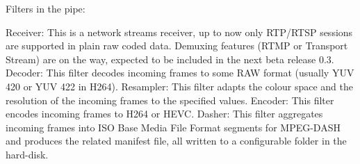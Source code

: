 Filters in the pipe:

Receiver: This is a network streams receiver, up to now only RTP/RTSP sessions are supported in plain raw coded data. Demuxing features (RTMP or Transport Stream) are on the way, expected to be included in the next beta release 0.3.
Decoder: This filter decodes incoming frames to some RAW format (usually YUV 420 or YUV 422 in H264).
Resampler: This filter adapts the colour space and the resolution of the incoming frames to the specified values.
Encoder: This filter encodes incoming frames to H264 or HEVC.
Dasher: This filter aggregates incoming frames into ISO Base Media File Format segments for MPEG-DASH and produces the related manifest file, all written to a configurable folder in the hard-disk.




